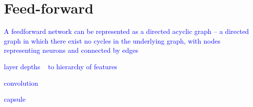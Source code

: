 \section{Feed-forward}

\textcolor{blue}{A feedforward network can be represented as a directed acyclic graph -- a directed graph in which there exist no cycles in the underlying graph, with nodes representing neurons and connected by edges}

\textcolor{blue}{layer depths ~ to hierarchy of features}





\textcolor{blue}{convolution}

\textcolor{blue}{capsule}

